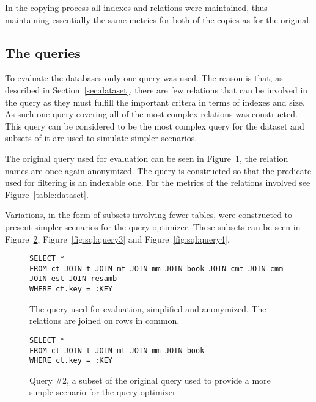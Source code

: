 In the copying process all indexes and relations were maintained, thus
maintaining essentially the same metrics for both of the copies as for the original.

\subsection{The queries}\label{sec:queries}
To evaluate the databases only one query was used. The reason is that, as
described in Section~\ref{sec:dataset}, there are few relations that can be
involved in the query as they must fulfill the important critera in terms of
indexes and size. As such one query covering all of the most complex relations was
constructed. This query can be considered to be the most complex query for the
dataset and subsets of it are used to simulate simpler scenarios.

The original query used for evaluation can be seen in
Figure~\ref{fig:sql:query1}, the relation names are once again anonymized. The
query is constructed so that the predicate used for filtering is an indexable
one. For the metrics of the relations involved see Figure~\ref{table:dataset}.

Variations, in the form of subsets involving fewer tables, were constructed to
present simpler scenarios for the query optimizer. These subsets can be seen in
Figure~\ref{fig:sql:query2}, Figure~\ref{fig:sql:query3} and Figure~\ref{fig:sql:query4}.

\begin{figure}[ht]
\begin{verbatim}
SELECT *
FROM ct JOIN t JOIN mt JOIN mm JOIN book JOIN cmt JOIN cmm JOIN est JOIN resamb
WHERE ct.key = :KEY
\end{verbatim}
  \caption[ The original query used for evaluation ]{The query used for
    evaluation, simplified and anonymized. The relations are joined on rows in
    common.}\label{fig:sql:query1}
\end{figure}

\begin{figure}[ht]
\begin{verbatim}
SELECT *
FROM ct JOIN t JOIN mt JOIN mm JOIN book
WHERE ct.key = :KEY
\end{verbatim}
  \caption[Query \#2, used for the second evaluation]{Query \#2, a subset of the
  original query used to provide a more simple scenario for the query
  optimizer.}\label{fig:sql:query2}
\end{figure}

